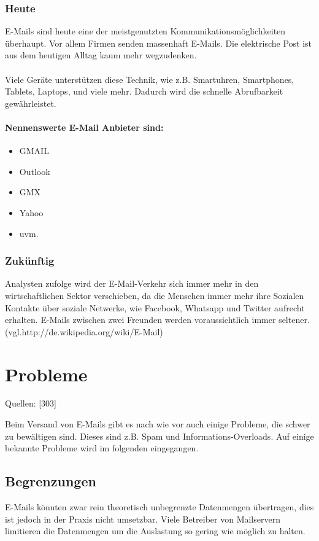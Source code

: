 \documentclass[12pt,a4paper]{report}
\begin{document}
\begin{onehalfspace}
\subsubsection{Heute}
E-Mails sind heute eine der meistgenutzten Kommunikationsmöglichkeiten überhaupt. Vor allem Firmen senden massenhaft E-Mails. Die elektrische Post ist aus dem heutigen Alltag kaum mehr wegzudenken.\\\\
Viele Geräte unterstützen diese Technik, wie z.B. Smartuhren, Smartphones, Tablets, Laptops, und viele mehr. Dadurch wird die schnelle Abrufbarkeit gewährleistet.
\paragraph{Nennenswerte E-Mail Anbieter sind:}
\begin{itemize}
\item GMAIL
\item Outlook
\item GMX
\item Yahoo
\item uvm.
\end{itemize} 
\subsubsection{Zukünftig}
Analysten zufolge wird der E-Mail-Verkehr sich immer mehr in den wirtschaftlichen Sektor verschieben, da die Menschen immer mehr ihre Sozialen Kontakte über soziale Netwerke, wie Facebook, Whatsapp und Twitter aufrecht erhalten. E-Mails zwischen zwei Freunden werden voraussichtlich immer seltener. (vgl.http://de.wikipedia.org/wiki/E-Mail)
\section{Probleme}
\begin{flushright}
\begin{tiny}
Quellen: [303]
\end{tiny}
\end{flushright}
Beim Versand von E-Mails gibt es nach wie vor auch einige Probleme, die schwer zu bewältigen sind. Dieses sind z.B. Spam und Informations-Overloads. Auf einige bekannte Probleme wird im folgenden eingegangen.
\subsection{Begrenzungen}
E-Mails könnten zwar rein theoretisch unbegrenzte Datenmengen übertragen, dies ist jedoch in der Praxis nicht umsetzbar. Viele Betreiber von Mailservern limitieren die Datenmengen um die Auslastung so gering wie möglich zu halten. 

\end{onehalfspace}
\end{document}
